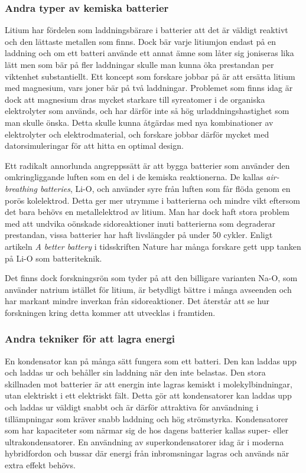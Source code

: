 \documentclass[a4paper,12pt]{article}
\begin{document}
\subsubsection{Andra typer av kemiska batterier}
Litium har fördelen som laddningsbärare i batterier att det är väldigt reaktivt och den lättaste metallen som finns. Dock bär varje litiumjon endast på en laddning och om ett batteri använde ett annat ämne som låter sig joniseras lika lätt men som bär på fler laddningar skulle man kunna öka prestandan per viktenhet substantiellt. Ett koncept som forskare jobbar på är att ersätta litium med magnesium, vars joner bär på två laddningar. Problemet som finns idag är dock att magnesium dras mycket starkare till syreatomer i de organiska elektrolyter som används, och har därför inte så hög urladdningshastighet som man skulle önska. Detta skulle kunna åtgärdas med nya kombinationer av elektrolyter och elektrodmaterial, och forskare jobbar därför mycket med datorsimuleringar för att hitta en optimal design. \cite{better-battery}

Ett radikalt annorlunda angreppssätt är att bygga batterier som använder den omkringliggande luften som en del i de kemiska reaktionerna. De kallas \emph{air-breathing batteries}, Li-O, och använder syre från luften som får flöda genom en porös kolelektrod. Detta ger mer utrymme i batterierna och mindre vikt eftersom det bara behövs en metallelektrod av litium. Man har dock haft stora problem med att undvika oönskade sidoreaktioner inuti batterierna som degraderar prestandan, vissa batterier har haft livslängder på under 50 cykler. Enligt artikeln \emph{A better battery} i tidsskriften Nature har många forskare gett upp tanken på Li-O som batteriteknik. \cite{better-battery}

Det finns dock forskningsrön som tyder på att den billigare varianten Na-O, som använder natrium istället för litium, är betydligt bättre i många avseenden och har markant mindre inverkan från sidoreaktioner. Det återstår att se hur forskningen kring detta kommer att utvecklas i framtiden. \cite{better-battery}

\subsubsection{Andra tekniker för att lagra energi}
En kondensator kan på många sätt fungera som ett batteri. Den kan laddas upp och laddas ur och behåller sin laddning när den inte belastas. Den stora skillnaden mot batterier är att energin inte lagras kemiskt i molekylbindningar, utan elektriskt i ett elektriskt fält. Detta gör att kondensatorer kan laddas upp och laddas ur väldigt snabbt och är därför attraktiva för användning i tillämpningar som kräver snabb laddning och hög strömstyrka. Kondensatorer som har kapaciteter som närmar sig de hos dagens batterier kallas super- eller ultrakondensatorer. En användning av superkondensatorer idag är i moderna hybridfordon och bussar där energi från inbromsningar lagras och används när extra effekt behövs.\cite{capacitors}
\end{document}
